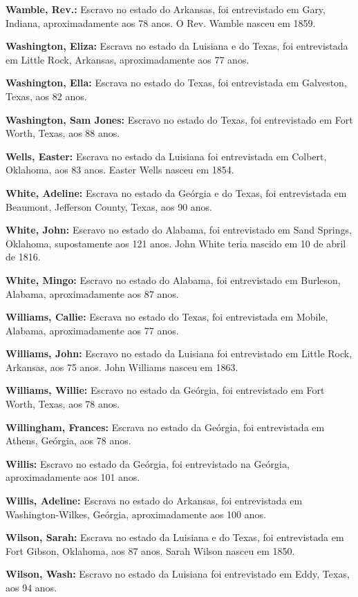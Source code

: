 \textbf{Wamble, Rev.:} Escravo no estado do Arkansas, foi entrevistado
em Gary, Indiana, aproximadamente aos 78 anos. O Rev. Wamble nasceu em
1859.

\textbf{Washington, Eliza:} Escrava no estado da Luisiana e do Texas,
foi entrevistada em Little Rock, Arkansas, aproximadamente aos 77 anos.

\textbf{Washington, Ella:} Escrava no estado do Texas, foi entrevistada
em Galveston, Texas, aos 82 anos.

\textbf{Washington, Sam Jones:} Escravo no estado do Texas, foi
entrevistado em Fort Worth, Texas, aos 88 anos.

\textbf{Wells, Easter:} Escrava no estado da Luisiana foi entrevistada
em Colbert, Oklahoma, aos 83 anos. Easter Wells nasceu em 1854.

\textbf{White, Adeline:} Escrava no estado da Geórgia e do Texas, foi
entrevistada em Beaumont, Jefferson County, Texas, aos 90 anos.

\textbf{White, John:} Escravo no estado do Alabama, foi entrevistado em
Sand Springs, Oklahoma, supostamente aos 121 anos. John White teria
nascido em 10 de abril de 1816.

\textbf{White, Mingo:} Escravo no estado do Alabama, foi entrevistado em
Burleson, Alabama, aproximadamente aos 87 anos.

\textbf{Williams, Callie:} Escrava no estado do Texas, foi entrevistada
em Mobile, Alabama, aproximadamente aos 77 anos.

\textbf{Williams, John:} Escravo no estado da Luisiana foi entrevistado
em Little Rock, Arkansas, aos 75 anos. John Williams nasceu em 1863.

\textbf{Williams, Willie:} Escravo no estado da Geórgia, foi
entrevistado em Fort Worth, Texas, aos 78 anos.

\textbf{Willingham, Frances:} Escrava no estado da Geórgia, foi
entrevistada em Athens, Geórgia, aos 78 anos.

\textbf{Willis:} Escravo no estado da Geórgia, foi entrevistado na
Geórgia, aproximadamente aos 101 anos.

\textbf{Willis, Adeline:} Escrava no estado do Arkansas, foi
entrevistada em Washington-Wilkes, Geórgia, aproximadamente aos 100
anos.

\textbf{Wilson, Sarah:} Escrava no estado da Luisiana e do Texas, foi
entrevistada em Fort Gibson, Oklahoma, aos 87 anos. Sarah Wilson nasceu
em 1850.

\textbf{Wilson, Wash:} Escravo no estado da Luisiana foi entrevistado em
Eddy, Texas, aos 94 anos.

